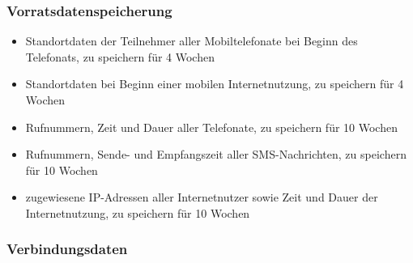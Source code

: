 \documentclass[12pt]{beamer}
\begin{document}
\begin{frame}
  \frametitle{Vorratsdatenspeicherung}
  \begin{itemize}
    \item<2-> Standortdaten der Teilnehmer aller Mobiltelefonate bei Beginn des Telefonats, zu speichern für 4 Wochen
    \item<3-> Standortdaten bei Beginn einer mobilen Internetnutzung, zu speichern für 4 Wochen
    \item<4-> Rufnummern, Zeit und Dauer aller Telefonate, zu speichern für 10 Wochen
    \item<5-> Rufnummern, Sende- und Empfangszeit aller SMS-Nachrichten, zu speichern für 10 Wochen
    \item<6-> zugewiesene IP-Adressen aller Internetnutzer sowie Zeit und Dauer der Internetnutzung, zu speichern für 10 Wochen
  \end{itemize}
\end{frame}

\begin{frame}
  \frametitle{Verbindungsdaten}
  \begin{center}
  \end{center}
\end{frame}
\end{document}
